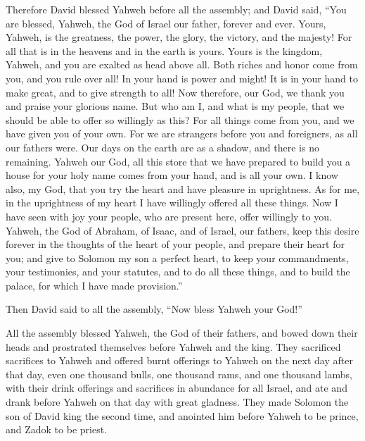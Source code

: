  Therefore David blessed Yahweh before all the assembly;
and David said, ``You are blessed, Yahweh, the God of Israel our father,
forever and ever.  Yours, Yahweh, is the greatness, the
power, the glory, the victory, and the majesty! For all that is in the
heavens and in the earth is yours. Yours is the kingdom, Yahweh, and you
are exalted as head above all.  Both riches and honor
come from you, and you rule over all! In your hand is power and might!
It is in your hand to make great, and to give strength to all!
 Now therefore, our God, we thank you and praise your
glorious name.  But who am I, and what is my people, that
we should be able to offer so willingly as this? For all things come
from you, and we have given you of your own.  For we are
strangers before you and foreigners, as all our fathers were. Our days
on the earth are as a shadow, and there is no remaining. 
Yahweh our God, all this store that we have prepared to build you a
house for your holy name comes from your hand, and is all your own.
 I know also, my God, that you try the heart and have
pleasure in uprightness. As for me, in the uprightness of my heart I
have willingly offered all these things. Now I have seen with joy your
people, who are present here, offer willingly to you. 
Yahweh, the God of Abraham, of Isaac, and of Israel, our fathers, keep
this desire forever in the thoughts of the heart of your people, and
prepare their heart for you;  and give to Solomon my son
a perfect heart, to keep your commandments, your testimonies, and your
statutes, and to do all these things, and to build the palace, for which
I have made provision.''

 Then David said to all the assembly, ``Now bless Yahweh
your God!''

All the assembly blessed Yahweh, the God of their fathers, and bowed
down their heads and prostrated themselves before Yahweh and the king.
 They sacrificed sacrifices to Yahweh and offered burnt
offerings to Yahweh on the next day after that day, even one thousand
bulls, one thousand rams, and one thousand lambs, with their drink
offerings and sacrifices in abundance for all Israel, 
and ate and drank before Yahweh on that day with great gladness. They
made Solomon the son of David king the second time, and anointed him
before Yahweh to be prince, and Zadok to be priest.

